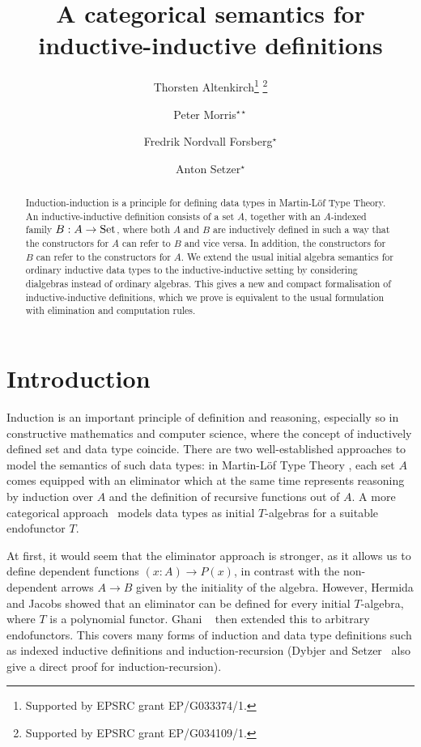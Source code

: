 \documentclass[orivec,envcountsame, ,envcountsect]{llncs}
\title{A categorical semantics for inductive-inductive definitions}
\author{Thorsten Altenkirch\inst{1}\thanks{Supported by EPSRC grant EP/G033374/1.}\fnmsep
                                   \thanks{Supported by EPSRC grant EP/G034109/1.}
\and Peter Morris\inst{1}$^{\star\star}$
\and Fredrik Nordvall Forsberg\inst{2}$^{\star}$
\and Anton Setzer\inst{2}$^{\star}$}
\institute{School of Computer Science, University of Nottingham, UK
      \and Department of Computer Science, Swansea University, UK}
\begin{document}
\maketitle

\begin{abstract}
  Induction-induction is a principle for defining data types in
  Martin-L\"of Type Theory. An inductive-inductive definition consists
  of a set $A$, together with an $A$-indexed family $B : A \to \text{Set}$,
  where both $A$ and $B$ are inductively defined in such a way that
  the constructors for $A$ can refer to $B$ and vice versa. In
  addition, the constructors for $B$ can refer to the constructors for
  $A$.
%
  We extend the usual initial algebra semantics for ordinary
  inductive data types to the inductive-inductive setting by
  considering dialgebras instead of ordinary algebras. This gives a
  new and compact formalisation of inductive-inductive definitions,
  which we prove is equivalent to the usual formulation with
  elimination and computation rules.
\end{abstract}

\section{Introduction}

Induction is an important principle of definition and reasoning,
especially so in constructive mathematics and computer science, where
the concept of inductively defined set and data type coincide. There
are two well-established approaches to model the semantics of such
data types: in Martin-L\"of Type Theory
\cite{martinlof1984bibliopolis}, each set $A$ comes equipped with an
eliminator which at the same time represents reasoning by induction
over $A$ and the definition of recursive functions out of $A$.  A more
categorical approach~\cite{goguenThatcherWagnerWright1977initialAlgebra}
models data types as initial $T$-algebras for a suitable endofunctor
$T$.

At first, it would seem that the eliminator approach is stronger, as
it allows us to define dependent functions $(x : A) \to P(x)$, in
contrast with the non-dependent arrows $A \to B$ given by the
initiality of the algebra. However, Hermida and Jacobs
\cite{hermidaJacobs1998initInduction} showed that an eliminator can be
defined for every initial $T$-algebra, where $T$ is a polynomial
functor.  Ghani \etal\ \cite{ghaniJohannFumex2010fibind} then extended
this to arbitrary endofunctors.  This covers many forms of induction
and data type definitions such as indexed inductive definitions
\cite{dybjer1994indfam} and induction-recursion
\cite{dybjersetzer1999finax} (Dybjer and
Setzer~\cite{dybjersetzer2003inalg} also give a direct proof for
induction-recursion).
\end{document}
